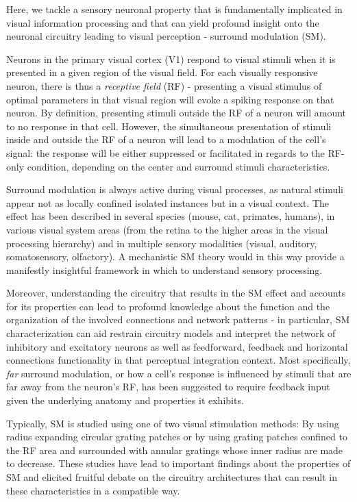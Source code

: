 Here, we tackle a sensory neuronal property that is fundamentally implicated in visual information processing and that can yield profound insight onto the neuronal circuitry leading to visual perception - surround modulation (SM).

Neurons in the primary visual cortex (V1) respond to visual stimuli when it is presented in a given region of the visual field. For each visually responsive neuron, there is thus a \textit{receptive field} (RF) - presenting a visual stimulus of optimal parameters in that visual region will evoke a spiking response on that neuron. By definition, presenting stimuli outside the RF of a neuron will amount to no response in that cell.
However, the simultaneous presentation of stimuli inside and outside the RF of a neuron will lead to a modulation of the cell's signal: the response will be either suppressed or facilitated in regards to the RF-only condition, depending on the center and surround stimuli characteristics.

Surround modulation is always active during visual processes, as natural stimuli appear not as locally confined isolated instances but in a visual context. The effect has been described in several species (mouse, cat, primates, humans), in various visual system  areas (from the retina to the higher areas in the visual processing hierarchy) and in multiple sensory modalities (visual, auditory, somatosensory, olfactory). A mechanistic SM theory would in this way provide a manifestly insightful framework in which to understand sensory processing. 

Moreover, understanding the circuitry that results in the SM effect and accounts for its properties can lead to profound knowledge about the function and the organization of the involved connections and network patterns - in particular, SM characterization can aid restrain circuitry models and interpret the network of inhibitory and excitatory neurons as well as feedforward, feedback and horizontal connections functionality in that perceptual integration context. Most specifically, \textit{far} surround modulation, or how a cell’s response is influenced by stimuli that are far away from the neuron’s RF, has been suggested to require feedback input given the underlying anatomy and properties it exhibits.


Typically, SM is studied using one of two visual stimulation methods: By using radius expanding circular grating patches or by using grating patches confined to the RF area and surrounded with annular gratings whose inner radius are made to decrease. These studies have lead to important findings about the properties of SM and elicited fruitful debate on the circuitry architectures that can result in these characteristics in a compatible way.

